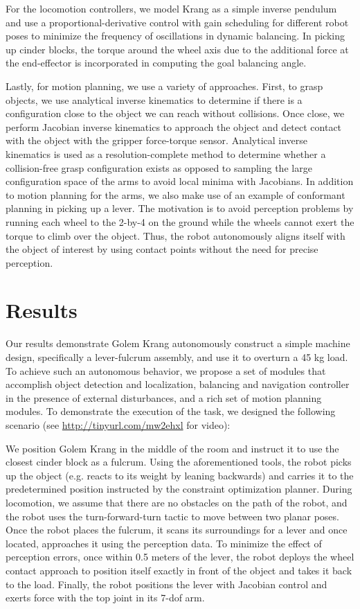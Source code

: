 \documentclass{article}
\begin{document}
For the locomotion controllers, we model Krang as a simple inverse pendulum and use a
proportional-derivative control with gain scheduling for different robot poses to minimize the
frequency of oscillations in dynamic balancing. In picking up cinder blocks, the torque around the
wheel axis due to the additional force at the end-effector is incorporated in computing the goal
balancing angle.

Lastly, for motion planning, we use a variety of approaches. First, to grasp objects, we use
analytical inverse kinematics to determine if there is a configuration close to the object we can
reach without collisions. Once close, we perform Jacobian inverse kinematics to approach the object
and detect contact with the object with the gripper force-torque sensor. Analytical inverse
kinematics is used as a resolution-complete method to determine whether a collision-free grasp
configuration exists as opposed to sampling the large configuration space of the arms to avoid local
minima with Jacobians. In addition to motion planning for the arms, we also make use of an example
of conformant planning in picking up a lever. The motivation is to avoid perception problems by
running each wheel to the 2-by-4 on the ground while the wheels cannot exert the torque to climb
over the object. Thus, the robot autonomously aligns itself with the object of interest by using
contact points without the need for precise perception.

\section{Results}

Our results demonstrate Golem Krang autonomously construct a simple machine design, specifically a
lever-fulcrum assembly, and use it to overturn a 45 kg load. To achieve such an autonomous behavior,
we propose a set of modules that accomplish object detection and localization, balancing and
navigation controller in the presence of external disturbances, and a rich set of motion planning
modules. To demonstrate the execution of the task, we designed the following scenario (see
\url{http://tinyurl.com/mw2ehxl} for video):

We position Golem Krang in the middle of the room and instruct it to use the closest cinder block as
a fulcrum. Using the aforementioned tools, the robot picks up the object (e.g. reacts to its weight
by leaning backwards) and carries it to the predetermined position instructed by the constraint
optimization planner. During locomotion, we assume that there are no obstacles on the path of the
robot, and the robot uses the turn-forward-turn tactic to move between two planar poses. Once the
robot places the fulcrum, it scans its surroundings for a lever and once located, approaches it
using the perception data. To minimize the effect of perception errors, once within 0.5 meters of
the lever, the robot deploys the wheel contact approach to position itself exactly in front of the
object and takes it back to the load. Finally, the robot positions the lever with Jacobian control
and exerts force with the top joint in its 7-dof arm.
\end{document}
